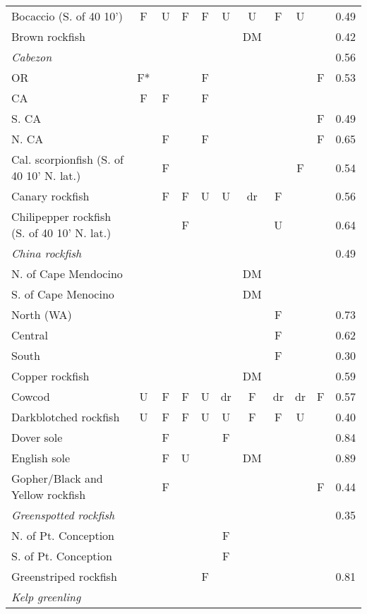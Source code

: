 \documentclass[12pt,]{article}
\begin{document}
\begin{longtable}{lcccccccccc}
  Bocaccio (S. of 40 10') & F & U & F & F & U & U & F & U &  & 0.49 \\ 
  Brown rockfish &  &  &  &  &  & DM &  &  &  & 0.42 \\ 
  \textit{Cabezon} &  &  &  &  &  &  &  &  &  & 0.56 \\ 
  OR & F*  &  &  & F &  &  &  &  & F & 0.53 \\ 
  CA & F & F &  & F &  &  &  &  &  &  \\ 
  S. CA &  &  &  &  &  &  &  &  & F & 0.49 \\ 
  N. CA &  & F &  & F &  &  &  &  & F & 0.65 \\ 
  Cal. scorpionfish (S. of 40 10' N. lat.) &  & F &  &  &  &  &  & F &  & 0.54 \\ 
  Canary rockfish &  & F & F & U & U & dr & F &  &  & 0.56 \\ 
  Chilipepper rockfish (S. of 40 10' N. lat.) &  &  & F &  &  &  & U &  &  & 0.64 \\ 
  \textit{China rockfish} &  &  &  &  &  &  &  &  &  & 0.49 \\ 
  N. of Cape Mendocino &  &  &  &  &  & DM &  &  &  &  \\ 
  S. of Cape Menocino &  &  &  &  &  & DM &  &  &  &  \\ 
  North (WA) &  &  &  &  &  &  & F &  &  & 0.73 \\ 
  Central &  &  &  &  &  &  & F &  &  & 0.62 \\ 
  South &  &  &  &  &  &  & F &  &  & 0.30 \\ 
  Copper rockfish &  &  &  &  &  & DM &  &  &  & 0.59 \\ 
  Cowcod & U & F & F & U & dr & F & dr & dr & F & 0.57 \\ 
  Darkblotched rockfish & U & F & F & U & U & F & F & U &  & 0.40 \\ 
  Dover sole &  & F &  &  & F &  &  &  &  & 0.84 \\ 
  English sole &  & F & U &  &  & DM &  &  &  & 0.89 \\ 
  Gopher/Black and Yellow rockfish &  & F &  &  &  &  &  &  & F & 0.44 \\ 
  \textit{Greenspotted rockfish} &  &  &  &  &  &  &  &  &  & 0.35 \\ 
  N. of Pt. Conception &  &  &  &  & F &  &  &  &  &  \\ 
  S. of Pt. Conception &  &  &  &  & F &  &  &  &  &  \\ 
  Greenstriped rockfish &  &  &  & F &  &  &  &  &  & 0.81 \\ 
  \textit{Kelp greenling} &  &  &  &  &  &  &  &  &  &  \\ 

\end{longtable}
\end{document}
